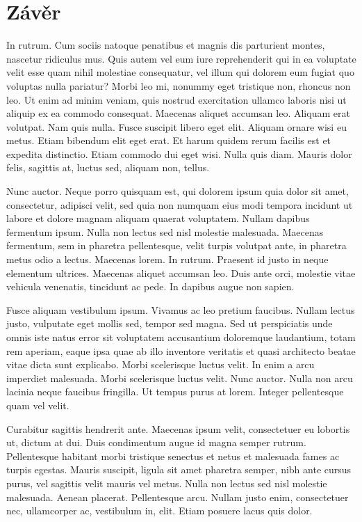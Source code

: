 \chapter{Závěr}





In rutrum. Cum sociis natoque penatibus et magnis dis parturient montes, nascetur ridiculus mus. Quis autem vel eum iure reprehenderit qui in ea voluptate velit esse quam nihil molestiae consequatur, vel illum qui dolorem eum fugiat quo voluptas nulla pariatur? Morbi leo mi, nonummy eget tristique non, rhoncus non leo. Ut enim ad minim veniam, quis nostrud exercitation ullamco laboris nisi ut aliquip ex ea commodo consequat. Maecenas aliquet accumsan leo. Aliquam erat volutpat. Nam quis nulla. Fusce suscipit libero eget elit. Aliquam ornare wisi eu metus. Etiam bibendum elit eget erat. Et harum quidem rerum facilis est et expedita distinctio. Etiam commodo dui eget wisi. Nulla quis diam. Mauris dolor felis, sagittis at, luctus sed, aliquam non, tellus.

Nunc auctor. Neque porro quisquam est, qui dolorem ipsum quia dolor sit amet, consectetur, adipisci velit, sed quia non numquam eius modi tempora incidunt ut labore et dolore magnam aliquam quaerat voluptatem. Nullam dapibus fermentum ipsum. Nulla non lectus sed nisl molestie malesuada. Maecenas fermentum, sem in pharetra pellentesque, velit turpis volutpat ante, in pharetra metus odio a lectus. Maecenas lorem. In rutrum. Praesent id justo in neque elementum ultrices. Maecenas aliquet accumsan leo. Duis ante orci, molestie vitae vehicula venenatis, tincidunt ac pede. In dapibus augue non sapien.

Fusce aliquam vestibulum ipsum. Vivamus ac leo pretium faucibus. Nullam lectus justo, vulputate eget mollis sed, tempor sed magna. Sed ut perspiciatis unde omnis iste natus error sit voluptatem accusantium doloremque laudantium, totam rem aperiam, eaque ipsa quae ab illo inventore veritatis et quasi architecto beatae vitae dicta sunt explicabo. Morbi scelerisque luctus velit. In enim a arcu imperdiet malesuada. Morbi scelerisque luctus velit. Nunc auctor. Nulla non arcu lacinia neque faucibus fringilla. Ut tempus purus at lorem. Integer pellentesque quam vel velit.

Curabitur sagittis hendrerit ante. Maecenas ipsum velit, consectetuer eu lobortis ut, dictum at dui. Duis condimentum augue id magna semper rutrum. Pellentesque habitant morbi tristique senectus et netus et malesuada fames ac turpis egestas. Mauris suscipit, ligula sit amet pharetra semper, nibh ante cursus purus, vel sagittis velit mauris vel metus. Nulla non lectus sed nisl molestie malesuada. Aenean placerat. Pellentesque arcu. Nullam justo enim, consectetuer nec, ullamcorper ac, vestibulum in, elit. Etiam posuere lacus quis dolor.

